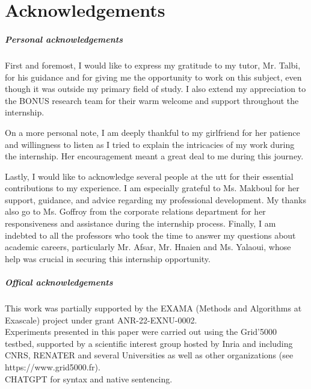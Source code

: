 \chapter*{Acknowledgements}

\paragraph{Personal acknowledgements}

First and foremost, I would like to express my gratitude to my tutor, Mr. Talbi, for his guidance and for giving me the opportunity to work on this subject, even though it was outside my primary field of study. I also extend my appreciation to the BONUS research team for their warm welcome and support throughout the internship.  

On a more personal note, I am deeply thankful to my girlfriend for her patience and willingness to listen as I tried to explain the intricacies of my work during the internship. Her encouragement meant a great deal to me during this journey.  

Lastly, I would like to acknowledge several people at the \acrfull{utt} for their essential contributions to my experience. I am especially grateful to Ms. Makboul for her support, guidance, and advice regarding my professional development. My thanks also go to Ms. Goffroy from the corporate relations department for her responsiveness and assistance during the internship process. Finally, I am indebted to all the professors who took the time to answer my questions about academic careers, particularly Mr. Afsar, Mr. Hnaien and Ms. Yalaoui, whose help was crucial in securing this internship opportunity.


\paragraph{Offical acknowledgements}
This work was partially supported by the EXAMA (Methods and Algorithms at Exascale) project under grant ANR-22-EXNU-0002.\\
Experiments presented in this paper were carried out using the Grid'5000 testbed, supported by a scientific interest group hosted by Inria and including CNRS, RENATER and several Universities as well as other organizations (see https://www.grid5000.fr).\\
CHATGPT for syntax and native sentencing. 
